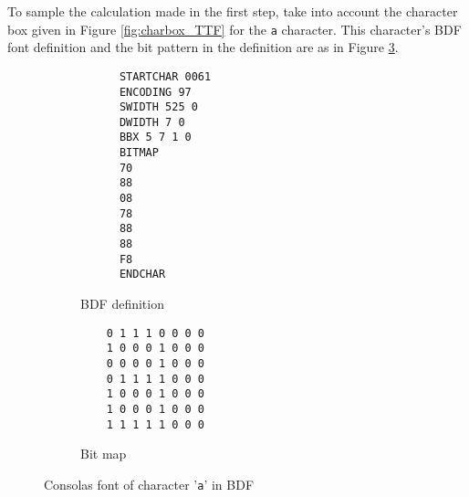 \documentclass{article}
\begin{document}
To sample the calculation made in the first step, take into account the character box given in Figure \ref{fig:charbox_TTF} for the \texttt{a} character. This character's BDF font definition and the bit pattern in the definition are as in Figure \ref{fig:letter_a_BDF}.

\begin{comment}
\begin{enumerate}
  \item Her bir karakter kutusunun ortalama CCT değerinin hesaplanması için kutuda bulunan font glyph'ın ön ve arka plan
    renklerinin CCT katkısı bu renklerin kutu içinde kapladığı piksel alanı oranları dikkate alınarak hesaplanmalıdır.
    Şekil \ref{fig:line_of_charboxes}'deki örnekte ön plan rengi yeşil, arka plan rengi beyaz olarak verilmiştir.

  \item Her bir karakter kutusunun içeriğe olan CCT katkısı, karakter kutusunun içerikteki sıklığı dikkate alınarak
    hesaplanmalıdır.  Örneğin Şekil \ref{fig:line_of_charboxes}'de verilen 6 karakterlik içerikte \texttt{a} karakterine
    ait karakter kutusu 2 kez, \texttt{s} karakterine ait kutu ise 1 kez geçmektedir.
\end{enumerate}


Birinci adımda yapılan hesaplamayı örneklemek için \texttt{a} karakteri için Şekil \ref{fig:charbox_TTF}'de verilen
karakter kutusu dikkate alınsın.  Bu karakterin BDF font tanımı ve tanımda yer alan bit eşlemi Şekil
\ref{fig:letter_a_BDF}'deki gibidir.
\end{comment}

\begin{figure}[htbp]
  \begin{subfigure}{0.48\textwidth}
    \centering
    \begin{BVerbatim}
      STARTCHAR 0061
      ENCODING 97
      SWIDTH 525 0
      DWIDTH 7 0
      BBX 5 7 1 0
      BITMAP
      70
      88
      08
      78
      88
      88
      F8
      ENDCHAR
    \end{BVerbatim}
    \caption{BDF definition}
    \label{code:letter_a_BDF_definitiion}
  \end{subfigure}
  \begin{subfigure}{0.48\textwidth}
    \centering
    \begin{BVerbatim}
    0 1 1 1 0 0 0 0
    1 0 0 0 1 0 0 0
    0 0 0 0 1 0 0 0
    0 1 1 1 1 0 0 0
    1 0 0 0 1 0 0 0
    1 0 0 0 1 0 0 0
    1 1 1 1 1 0 0 0
    \end{BVerbatim}
    \caption{Bit map}
    \label{fig:letter_a_BDF_bitmap}
  \end{subfigure}

  \caption{Consolas font of character '\texttt{a}' in BDF}
  \label{fig:letter_a_BDF}
\end{figure}
\end{document}
